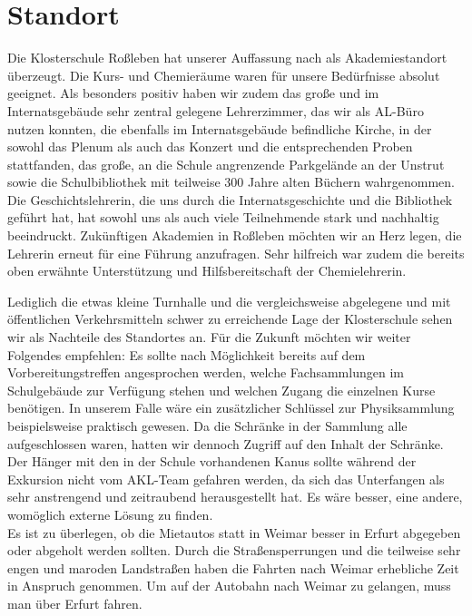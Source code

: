 \documentclass{scrartcl}
\begin{document}
\section*{Standort}

Die Klosterschule Ro{\ss}leben hat unserer Auffassung nach als Akademiestandort {\"u}berzeugt. Die Kurs- und Chemier{\"a}ume waren f{\"u}r unsere Bed{\"u}rfnisse absolut geeignet. Als besonders positiv haben wir zudem das gro{\ss}e und im Internatsgeb{\"a}ude sehr zentral gelegene Lehrerzimmer, das wir als AL-B{\"u}ro nutzen konnten, die ebenfalls im Internatsgeb{\"a}ude befindliche Kirche, in der sowohl das Plenum als auch das Konzert und die entsprechenden Proben stattfanden, das gro{\ss}e, an die Schule angrenzende Parkgel{\"a}nde an der Unstrut sowie die Schulbibliothek mit teilweise 300 Jahre alten B{\"u}chern wahrgenommen. Die Geschichtslehrerin, die uns durch die Internatsgeschichte und die Bibliothek gef{\"u}hrt hat, hat sowohl uns als auch viele Teilnehmende stark und nachhaltig beeindruckt. Zuk{\"u}nftigen Akademien in Ro{\ss}leben m{\"o}chten wir an Herz legen, die Lehrerin erneut f{\"u}r eine F{\"u}hrung anzufragen. Sehr hilfreich war zudem die bereits oben erw{\"a}hnte Unterst{\"u}tzung und Hilfsbereitschaft der Chemielehrerin.\medskip

Lediglich die etwas kleine Turnhalle und die vergleichsweise abgelegene und
mit {\"o}ffentlichen Verkehrsmitteln schwer zu erreichende Lage der
Klosterschule sehen wir als Nachteile des Standortes an. F{\"u}r die Zukunft
m{\"o}chten wir weiter Folgendes empfehlen: Es sollte nach M{\"o}glichkeit
bereits auf dem Vorbereitungstreffen angesprochen werden, welche Fachsammlungen
im Schulgeb{\"a}ude zur Verf{\"u}gung stehen und welchen Zugang die einzelnen
Kurse ben{\"o}tigen. In unserem Falle w{\"a}re ein zus{\"a}tzlicher
Schl{\"u}ssel zur Physiksammlung beispielsweise praktisch gewesen. Da die
Schr{\"a}nke in der Sammlung alle aufgeschlossen waren, hatten wir dennoch
Zugriff auf den Inhalt der Schr{\"a}nke.\\
Der H{\"a}nger mit den in der Schule vorhandenen Kanus sollte w{\"a}hrend
der Exkursion nicht vom AKL-Team gefahren werden, da sich das Unterfangen als
sehr anstrengend und zeitraubend herausgestellt hat.
Es w{\"a}re besser, eine andere,
wom{\"o}glich externe L{\"o}sung zu finden.\\
Es ist zu {\"u}berlegen, ob die Mietautos statt in
Weimar besser in Erfurt abgegeben oder abgeholt werden sollten. Durch die
Stra{\ss}ensperrungen und die teilweise sehr engen und maroden
Landstra{\ss}en haben die Fahrten nach Weimar erhebliche Zeit in Anspruch
genommen. Um auf der Autobahn nach Weimar zu gelangen, muss man {\"u}ber
Erfurt fahren.\bigskip
\end{document}
